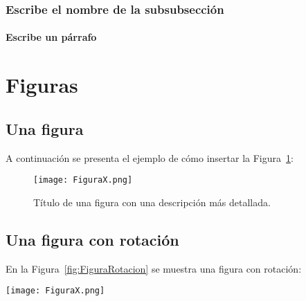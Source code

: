 \subsubsection{Escribe el nombre de la subsubsección}
\lipsum[2]

\paragraph{Escribe un párrafo} %
\lipsum[2]



\section{Figuras}
\subsection{Una figura}
A continuación se presenta el ejemplo de cómo insertar la Figura~\ref{fig:EjemploFigura}:

\begin{figure}[htp]
	\centering
	\texttt{[image: FiguraX.png]}
    \caption[Título de una figura.]%
    {Título de una figura con una descripción más detallada. \lipsum[1]} %
    \label{fig:EjemploFigura}
\end{figure}


\subsection{Una figura con rotación}

En la Figura~\ref{fig:FiguraRotacion} se muestra una figura con rotación:

\begin{sidewaysfigure}[htp]
	\centering 
	\texttt{[image: FiguraX.png]}
    \caption[Título de una figura con rotación.]%
    {Título de una figura con rotación con una descripción más detallada. \lipsum[1]} %
    \label{fig:FiguraRotacion}
\end{sidewaysfigure}


